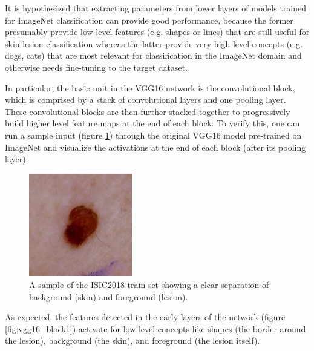 It is hypothesized that extracting parameters from lower layers of models trained for ImageNet classification can provide good performance, because the former presumably provide low-level features (e.g. shapes or lines) that are still useful for skin lesion classification whereas the latter provide very high-level concepts (e.g. dogs, cats) that are most relevant for classification in the ImageNet domain and otherwise needs fine-tuning to the target dataset.

In particular, the basic unit in the VGG16 network is the convolutional block, which is comprised by a stack of convolutional layers and one pooling layer. These convolutional blocks are then further stacked together to progressively build higher level feature maps at the end of each block. To verify this, one can run a sample input (figure \ref{fig:sample_input}) through the original VGG16 model pre-trained on ImageNet and visualize the activations at the end of each block (after its pooling layer).

\begin{figure}
    \centering
    \includegraphics[width=0.4\textwidth]{figs/sample_input.jpg}
    \caption{A sample of the ISIC2018 train set showing a clear separation of background (skin) and foreground (lesion).}
    \label{fig:sample_input}
\end{figure}

As expected, the features detected in the early layers of the network (figure \ref{fig:vgg16_block1}) activate for low level concepts like shapes (the border around the lesion), background (the skin), and foreground (the lesion itself).

